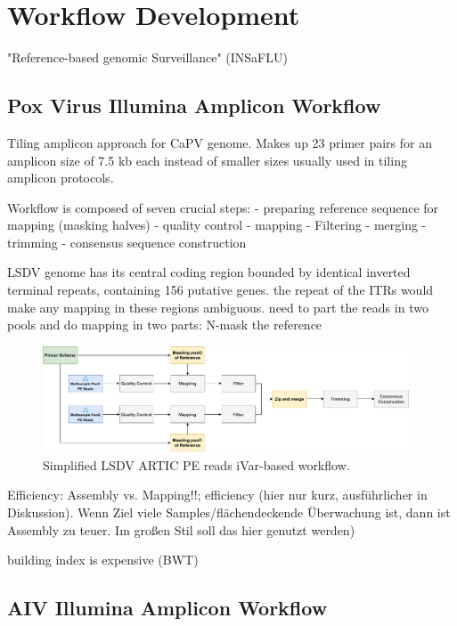 \section{Workflow Development}
"Reference-based genomic Surveillance" (INSaFLU)

\subsection{Pox Virus Illumina Amplicon Workflow}

Tiling amplicon approach for CaPV genome. Makes up 23 primer pairs for an amplicon size of 7.5 kb each instead of smaller sizes usually used in tiling amplicon protocols.

Workflow is composed of seven crucial steps:
- preparing reference sequence for mapping (masking halves)
- quality control
- mapping
- Filtering
- merging
- trimming
- consensus sequence construction

LSDV genome has its central coding region bounded by identical inverted terminal repeats,
containing 156 putative genes. the repeat of the ITRs would make any mapping in these regions ambiguous.
need to part the reads in two pools and do mapping in two parts: N-mask the  reference 

\begin{figure}
	\centering
	\includegraphics[width=0.97\textwidth]{media/3-pipelines-LSDV.pdf}
	\caption{Simplified LSDV ARTIC PE reads iVar-based workflow.}
	\label{fig:3-pipelines-lsdv}
\end{figure}

Efficiency: Assembly vs. Mapping!!; efficiency (hier nur kurz, ausführlicher in Diskussion). Wenn Ziel viele Samples/flächendeckende Überwachung ist, dann ist Assembly zu teuer. Im großen Stil soll das hier genutzt werden)

building index is expensive (BWT)

\subsection{AIV Illumina Amplicon Workflow}


